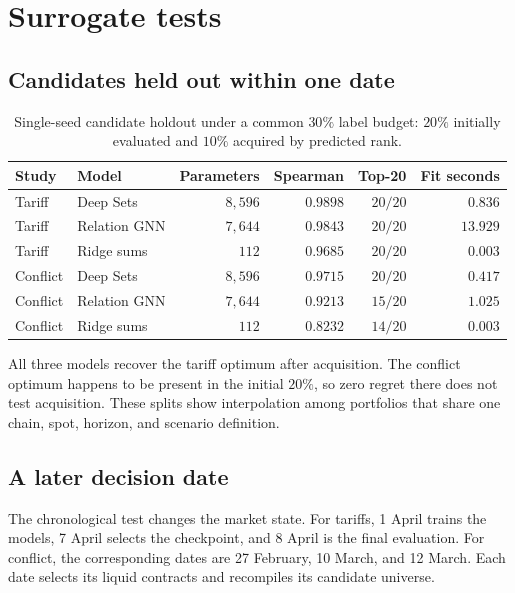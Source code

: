 \documentclass{strategynet-journal}
\begin{document}
\section{Surrogate tests}

\subsection{Candidates held out within one date}

\begin{table}[H]
\centering
\small
\begin{tabular}{@{}llrrrr@{}}
\toprule
Study & Model & Parameters & Spearman & Top-20 & Fit seconds \\
\midrule
Tariff & Deep Sets & \(8{,}596\) & \(0.9898\) & \(20/20\) & \(0.836\) \\
Tariff & Relation GNN & \(7{,}644\) & \(0.9843\) & \(20/20\) & \(13.929\) \\
Tariff & Ridge sums & \(112\) & \(0.9685\) & \(20/20\) & \(0.003\) \\
\addlinespace
Conflict & Deep Sets & \(8{,}596\) & \(0.9715\) & \(20/20\) & \(0.417\) \\
Conflict & Relation GNN & \(7{,}644\) & \(0.9213\) & \(15/20\) & \(1.025\) \\
Conflict & Ridge sums & \(112\) & \(0.8232\) & \(14/20\) & \(0.003\) \\
\bottomrule
\end{tabular}
\caption{Single-seed candidate holdout under a common \(30\%\) label budget:
\(20\%\) initially evaluated and \(10\%\) acquired by predicted rank.}
\label{tab:models}
\end{table}

All three models recover the tariff optimum after acquisition.  The conflict
optimum happens to be present in the initial \(20\%\), so zero regret there
does not test acquisition.  These splits show interpolation among portfolios
that share one chain, spot, horizon, and scenario definition.

\subsection{A later decision date}

The chronological test changes the market state.  For tariffs, 1 April trains
the models, 7 April selects the checkpoint, and 8 April is the final
evaluation.  For conflict, the corresponding dates are 27 February, 10 March,
and 12 March.  Each date selects its liquid contracts and recompiles its
candidate universe.
\end{document}
